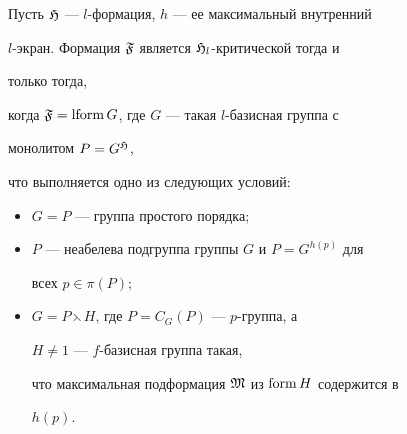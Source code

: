  


\begin{thm} 


Пусть $\frak H$ --- $l$-формация, $h$ --- ее максимальный внутренний 


$l$-экран. Формация $\frak F$ является $\frak H_l$-критической тогда и 


только тогда, 


когда $\frak F=\operatorname{lform} G$, где $G$ --- такая $l$-базисная группа с 


монолитом $P=G^{\frak H}$, 


что выполняется одно из следующих условий$:$ 


\begin{itemize} 


\item[1)] $G=P$ --- группа простого порядка$;$ 


\item[2)] $P$ --- неабелева подгруппа группы $G$ и $P=G^{h(p)}$ для 


всех $p\in\pi(P);$ 


\item[3)] $G=P\leftthreetimes H$, где $P=C_G(P)$ --- $p$-группа, а 


$H\ne1$ --- $f$-базисная группа такая, 


что максимальная подформация $\frak M$ из $\operatorname{form} H$ содержится в 


$h(p)$. 


\end{itemize} 


\end{thm} 


 


